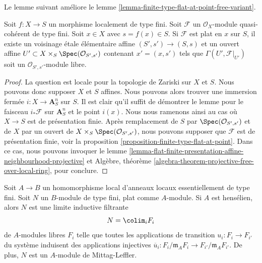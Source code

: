 \noindent
Le lemme suivant améliore le
lemme \ref{lemma-finite-type-flat-at-point-free-variant}.

\begin{lemma}
\label{lemma-flat-finite-type-affine-neighbourhood-projective}
Soit $f : X \to S$ un morphisme localement de type fini.
Soit $\mathcal{F}$ un $\mathcal{O}_X$-module quasi-cohérent
de type fini. Soit $x \in X$ avec $s = f(x) \in S$.
Si $\mathcal{F}$ est plat en $x$ sur $S$, il existe un voisinage
\'etale élémentaire affine $(S', s') \to (S, s)$ et
un ouvert affine $U' \subset X \times_S \Spec(\mathcal{O}_{S', s'})$
contenant $x' = (x, s')$ tels que
$\Gamma(U', \mathcal{F}|_{U'})$ soit un
$\mathcal{O}_{S', s'}$-module libre.
\end{lemma}

\begin{proof}
La question est locale pour la topologie de Zariski sur $X$ et $S$. Nous pouvons donc supposer
$X$ et $S$ affines. Nous pouvons alors trouver une immersion fermée
$i : X \to \mathbf{A}^n_S$ sur $S$. Il est clair qu'il suffit de
démontrer le lemme pour le faisceau $i_*\mathcal{F}$ sur $\mathbf{A}^n_S$
et le point $i(x)$. Nous nous ramenons ainsi au cas où $X \to S$ est
de présentation finie. Après remplacement de $S$ par
$\Spec(\mathcal{O}_{S', s'})$ et de $X$ par un ouvert de
$X \times_S \Spec(\mathcal{O}_{S', s'})$, nous pouvons supposer que
$\mathcal{F}$ est de présentation finie, voir la
proposition \ref{proposition-finite-type-flat-at-point}.
Dans ce cas, nous pouvons invoquer le
lemme \ref{lemma-flat-finite-presentation-affine-neighbourhood-projective}
et
Algèbre, théorème \ref{algebra-theorem-projective-free-over-local-ring},
pour conclure.
\end{proof}

\begin{lemma}
\label{lemma-flat-finite-type-local-colimit-free}
Soit $A \to B$ un homomorphisme local d'anneaux locaux essentiellement de
type fini. Soit $N$ un $B$-module de type fini, plat comme $A$-module.
Si $A$ est hensélien, alors $N$ est une limite inductive filtrante
$$
N = \colim_i F_i
$$
de $A$-modules libres $F_i$ telle que toutes les applications de transition
$u_i : F_i \to F_{i'}$ du système induisent des applications injectives
$\overline{u}_i : F_i/\mathfrak m_AF_i \to F_{i'}/\mathfrak m_AF_{i'}$.
De plus, $N$ est un $A$-module de Mittag-Leffler.
\end{lemma}

